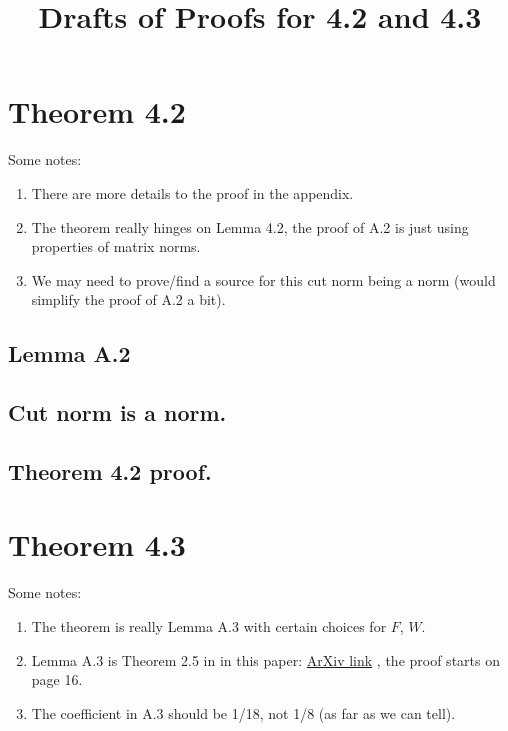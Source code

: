 \documentclass{amsart}
\title{Drafts of Proofs for 4.2 and 4.3}
\begin{document}
\maketitle

\section{Theorem 4.2}

Some notes:
\begin{enumerate}
    \item There are more details to the proof in the appendix.
    \item The theorem really hinges on Lemma 4.2, the proof of A.2 is just using properties of matrix norms.
    \item We may need to prove/find a source for this cut norm being a norm (would simplify the proof of A.2 a bit).
\end{enumerate}

\subsection{Lemma A.2}



\subsection{Cut norm is a norm.}



\subsection{Theorem 4.2 proof.}

\section{Theorem 4.3}

Some notes:
\begin{enumerate}
    \item The theorem is really Lemma A.3 with certain choices for $F$, $W$.
    \item Lemma A.3 is Theorem 2.5 in \cite{lov-sze} in this paper: \href{https://arxiv.org/pdf/math/0408173.pdf}{ArXiv link} \cite{lov-sze}, the proof starts on page 16.
    \item The coefficient in A.3 should be 1/18, not 1/8 (as far as we can tell).
\end{enumerate}
\end{document}
